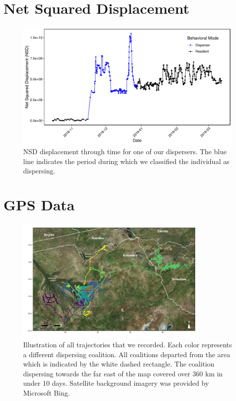 \documentclass[abstract=off,10pt,a4paper,bibliography=totocnumbered]{article}
\begin{document}
\section{Net Squared Displacement}

\begin{figure}[hbpt]
  \begin{center}
    \includegraphics[width = \textwidth]{99_NSD.pdf}
    \caption{NSD displacement through time for one of our dispersers. The blue
    line indicates the period during which we classified the individual as
    dispersing.}
    \label{NSD}
  \end{center}
\end{figure}

\newpage
{}
\section{GPS Data}
\begin{figure}[hbtp]
  \begin{center}
    \includegraphics[width = 0.84\textwidth]{99_Trajectories.pdf}
    \caption{Illustration of all trajectories that we recorded. Each color
    represents a different dispersing coalition. All coalitions departed from
    the area which is indicated by the white dashed rectangle. The coalition
    dispersing towards the far east of the map covered over 360 km in under 10
    days. Satellite background imagery was provided by Microsoft Bing.}
    \label{Trajectories}
  \end{center}
\end{figure}
\end{document}
